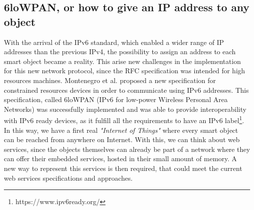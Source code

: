 \subsection{6loWPAN, or how to give an IP address to any object}
With the arrival of the IPv6 standard\cite{rfc2460}, which enabled a wider range of IP addresses than the previous IPv4, the possibility to assign an address to each smart object became a reality.
This arise new challenges in the implementation for this new network protocol, since the RFC specification was intended for high resources machines.
Montenegro et al. proposed a new specification\cite{rfc4944} for constrained resources devices in order to communicate using IPv6 addresses.
This specification, called 6loWPAN (IPv6 for low-power Wireless Personal Area Networks) was successfully implemented\cite{durvy08making} and was able to provide interoperability with IPv6 ready devices, as it fulfill all the requirements to have an IPv6 label\footnote{https://www.ipv6ready.org/}.
In this way, we have a first real \textit{"Internet of Things"} where every smart object can be reached from anywhere on Internet.
With this, we can think about web services, since the objects themselves can already be part of a network where they can offer their embedded services, hosted in their small amount of memory.
A new way to represent this services is then required, that could meet the current web services specifications and approaches.

